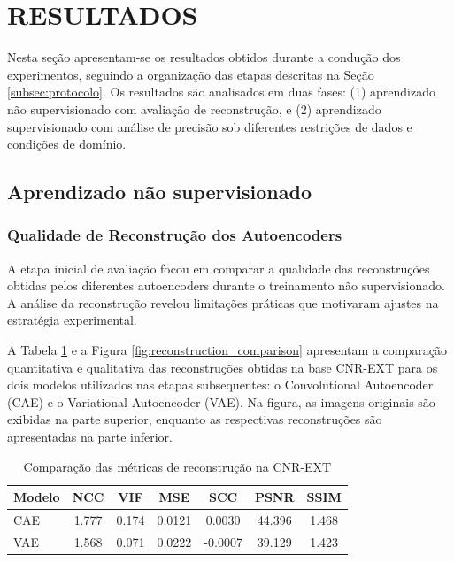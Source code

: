 \documentclass{article}
\begin{document}
\section{RESULTADOS}\label{sec:resultados}

Nesta seção apresentam-se os resultados obtidos durante a condução dos experimentos, seguindo a organização das etapas descritas na Seção \ref{subsec:protocolo}. Os resultados são analisados em duas fases: (1) aprendizado não supervisionado com avaliação de reconstrução, e (2) aprendizado supervisionado com análise de precisão sob diferentes restrições de dados e condições de domínio.

\subsection{Aprendizado não supervisionado}\label{subsec:res_unsupervised}

\subsubsection{Qualidade de Reconstrução dos Autoencoders}

A etapa inicial de avaliação focou em comparar a qualidade das reconstruções obtidas pelos diferentes autoencoders durante o treinamento não supervisionado. A análise da reconstrução revelou limitações práticas que motivaram ajustes na estratégia experimental.

A Tabela \ref{tab:metrics_reconstruction} e a Figura \ref{fig:reconstruction_comparison} apresentam a comparação quantitativa e qualitativa das reconstruções obtidas na base CNR-EXT para os dois modelos utilizados nas etapas subsequentes: o Convolutional Autoencoder (CAE) e o Variational Autoencoder (VAE). Na figura, as imagens originais são exibidas na parte superior, enquanto as respectivas reconstruções são apresentadas na parte inferior.

\begin{table}[htbp]
\centering
\caption{Comparação das métricas de reconstrução na CNR-EXT}
\label{tab:metrics_reconstruction}
\begin{tabular}{lcccccc}
\toprule
\textbf{Modelo} & \textbf{NCC} & \textbf{VIF} & \textbf{MSE} & \textbf{SCC} & \textbf{PSNR} & \textbf{SSIM} \\
\midrule
CAE & 1.777 & 0.174 & 0.0121 & 0.0030 & 44.396 & 1.468 \\
VAE & 1.568 & 0.071 & 0.0222 & -0.0007 & 39.129 & 1.423 \\
\bottomrule
\end{tabular}
\end{table}
\end{document}
